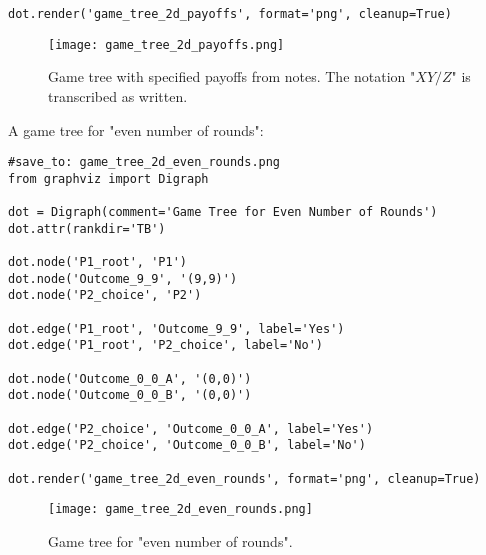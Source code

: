 \begin{enumerate}
\begin{verbatim}
dot.render('game_tree_2d_payoffs', format='png', cleanup=True)
\end{verbatim}
    \begin{figure}[H]
    \centering
    \texttt{[image: game\_tree\_2d\_payoffs.png]}
    \caption{Game tree with specified payoffs from notes. The notation "$X Y/Z$" is transcribed as written.}
    \label{fig:game_tree_2d_payoffs}
    \end{figure}

    A game tree for "even number of rounds":
\begin{verbatim}
#save_to: game_tree_2d_even_rounds.png
from graphviz import Digraph

dot = Digraph(comment='Game Tree for Even Number of Rounds')
dot.attr(rankdir='TB')

dot.node('P1_root', 'P1')
dot.node('Outcome_9_9', '(9,9)')
dot.node('P2_choice', 'P2')

dot.edge('P1_root', 'Outcome_9_9', label='Yes')
dot.edge('P1_root', 'P2_choice', label='No')

dot.node('Outcome_0_0_A', '(0,0)')
dot.node('Outcome_0_0_B', '(0,0)')

dot.edge('P2_choice', 'Outcome_0_0_A', label='Yes')
dot.edge('P2_choice', 'Outcome_0_0_B', label='No')

dot.render('game_tree_2d_even_rounds', format='png', cleanup=True)
\end{verbatim}
    \begin{figure}[H]
    \centering
    \texttt{[image: game\_tree\_2d\_even\_rounds.png]}
    \caption{Game tree for "even number of rounds".}
    \label{fig:game_tree_2d_even_rounds}
    \end{figure}
\end{enumerate}


